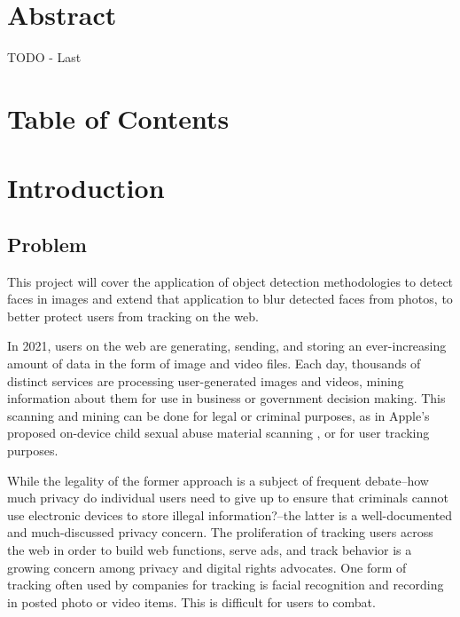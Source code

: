 \documentclass{article}
\newcommand{\nocontentsline}[3]{}
\newcommand{\tocless}[2]{\bgroup\let\addcontentsline=\nocontentsline#1{#2}\egroup}
\begin{document}
  
  \graphicspath{{./images/}}
  \section*{Abstract}
  TODO - Last
  \newpage
  \section*{Table of Contents}
  \def\contentsname{\empty}
  \tableofcontents
  \newpage
  \section{Introduction}
  \tocless\subsection{Problem}
  
  This project will cover the application of object detection methodologies to detect faces in images and extend that application to blur detected faces from photos, to better protect users from tracking on the web.
  
  \tocless\subsection{Motivations}
  In 2021, users on the web are generating, sending, and storing an ever-increasing amount of data in the form of image and video files.
  Each day, thousands of distinct services are processing user-generated images and videos, mining information about them for use in business or government decision making.
  This scanning and mining can be done for legal or criminal purposes, as in Apple's proposed on-device child sexual abuse material scanning \cite{ElectronicFrontierFoundation2021CoalitionCook}, or for user tracking purposes.
  
  While the legality of the former approach is a subject of frequent debate--how much privacy do individual users need to give up to ensure that criminals cannot use electronic devices to store illegal information?--the latter is a well-documented and much-discussed privacy concern.
  The proliferation of tracking users across the web in order to build web functions, serve ads, and track behavior is a growing concern among privacy and digital rights advocates.
  One form of tracking often used by companies for tracking is facial recognition and recording in posted photo or video items.
  This is difficult for users to combat.
 
\end{document}
